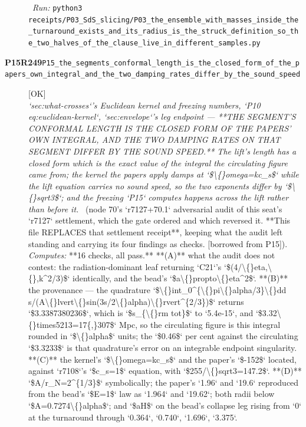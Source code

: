 \begin{description}
\ \emph{Run:} \texttt{python3 receipts/P03\_SdS\_slicing/P03\_the\_ensemble\_with\_masses\_inside\_the\_turnaround\_exists\_and\_its\_radius\_is\_the\_struck\_definition\_so\_the\_two\_halves\_of\_the\_clause\_live\_in\_different\_samples.py}
\item[\rcptlabel{P15_the_segments_conformal_length_is_the_closed_form_of_the_papers_own_integral_and_the_two_damping_rates_differ_by_the_sound_speed}{P15R249}\textbf{P15R249}\quad\texttt{P15\_the\_segments\_conformal\_length\_is\_the\_closed\_form\_of\_the\_papers\_own\_integral\_and\_the\_two\_damping\_rates\_differ\_by\_the\_sound\_speed}]\hfill\textsf{[OK]}\\
\textit{`sec:what-crosses`'s Euclidean kernel and freezing numbers, `P10 eq:euclidean-kernel`, `sec:envelope`'s leg endpoint ---  **THE SEGMENT'S CONFORMAL LENGTH IS THE CLOSED FORM OF THE PAPERS' OWN INTEGRAL, AND THE TWO DAMPING RATES ON THAT SEGMENT DIFFER BY THE SOUND SPEED.** The lift's length has a closed form which is the exact value of the integral the circulating figure came from; the kernel the papers apply damps at `\$\textbackslash\{\}omega=kc\_s\$` while the lift equation carries no sound speed, so the two exponents differ by `\$\textbackslash\{\}sqrt3\$`; and the freezing `P15` computes happens across the lift rather than before it.} \ (node 70's `r7127+70.1` adversarial audit of this seat's `r7127` settlement, which the gate ordered and which reversed it. **This file REPLACES that settlement receipt**, keeping what the audit left standing and carrying its four findings as checks. [borrowed from P15]). 
\emph{Computes:} **16 checks, all pass.** **(A)** what the audit does not contest: the radiation-dominant leaf returning `C21`'s `\$(4/\textbackslash\{\}eta,\textbackslash\{\},k\textasciicircum{}2/3)\$` identically, and the bead's `\$a\textbackslash\{\}propto\textbackslash\{\}eta\textasciicircum{}2\$`. **(B)** the provenance --- the quadrature `\$\textbackslash\{\}int\_0\textasciicircum{}\{\textbackslash\{\}pi\textbackslash\{\}alpha/3\}\textbackslash\{\}dd s/(A\textbackslash\{\}lvert\textbackslash\{\}sin(3s/2\textbackslash\{\}alpha)\textbackslash\{\}rvert\textasciicircum{}\{2/3\})\$` returns `\$3.3387380236\$`, which is `\$s\_\{\textbackslash\{\}rm tot\}\$` to `5.4e-15`, and `\$3.32\textbackslash\{\}times5213=17\{,\}307\$` Mpc, so the circulating figure is this integral rounded in `\$\textbackslash\{\}alpha\$` units; the `\$0.46\$` per cent against the circulating `\$3.3233\$` is that quadrature's error on an integrable endpoint singularity. **(C)** the kernel's `\$\textbackslash\{\}omega=kc\_s\$` and the paper's `\$-152\$` located, against `r7108`'s `\$c\_s=1\$` equation, with `\$255/\textbackslash\{\}sqrt3=147.2\$`. **(D)** `\$A/r\_N=2\textasciicircum{}\{1/3\}\$` symbolically; the paper's `1.96` and `19.6` reproduced from the bead's `\$E=1\$` law as `1.964` and `19.62`; both radii below `\$A=0.7274\textbackslash\{\}alpha\$`; and `\$aH\$` on the bead's collapse leg rising from `0` at the turnaround through `0.364`, `0.740`, `1.696`, `3.375`.

\end{description}

